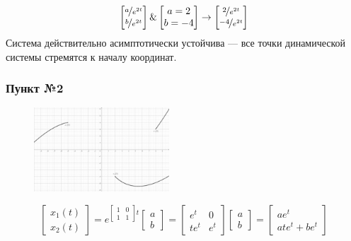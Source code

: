 \documentclass[a3paper,14pt]{extarticle}
\begin{document}
$$\begin{bmatrix}
    \nicefrac{a}{e^{2t}} \\ \nicefrac{b}{e^{2t}}
\end{bmatrix} \& \begin{bmatrix}
    a=2 \\ b=-4
\end{bmatrix} \rightarrow \begin{bmatrix}
    \nicefrac{2}{e^{2t}} \\ \nicefrac{-4}{e^{2t}}
\end{bmatrix}$$
Система действительно асимптотически устойчива --- все точки динамической системы стремятся к началу координат.
\pagebreak
\subsubsection*{Пункт №2}
\begin{figure}
    \centering
    \includegraphics[width=0.45\textwidth]{2.2.png}
\end{figure}
$$\begin{bmatrix}
    x_1(t) \\ x_2(t)
\end{bmatrix} = e^{\left[\begin{smallmatrix}
    1 & 0 \\ 1 & 1
\end{smallmatrix}\right]t}\begin{bmatrix}
    a \\ b
\end{bmatrix} = \begin{bmatrix}
    e^t & 0 \\ t e^t & e^t
\end{bmatrix}\begin{bmatrix}
    a \\ b
\end{bmatrix} = \begin{bmatrix}
    ae^t \\ ate^t + be^t
\end{bmatrix}$$
\end{document}
